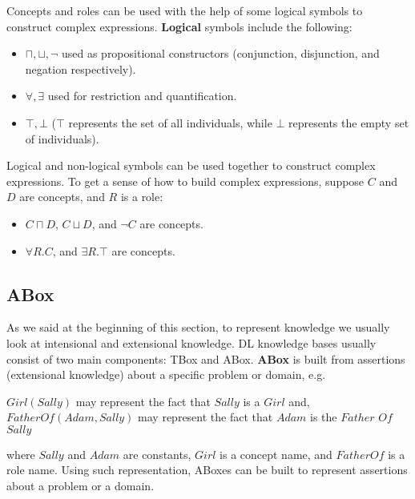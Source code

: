 \documentclass{sfuthesis}
\theoremstyle{plain}
\theoremstyle{definition}
\begin{document}
Concepts and roles can be used with the help of some logical symbols to construct complex expressions. \textbf{Logical} symbols include the following:
\begin{itemize}
\item $\sqcap, \sqcup, \neg$ used as propositional constructors (conjunction, disjunction, and negation respectively).
\item $\forall, \exists$ used for restriction and quantification.
\item $\top, \bot$ ($\top$ represents the set of all individuals, while $\bot$ represents the empty set of individuals). 
\end{itemize}

Logical and non-logical symbols can be used together to construct complex expressions. To get a sense of how to build complex expressions, suppose $C$ and $D$ are concepts, and $R$ is a role:
\begin{itemize}
\item $C \sqcap D$, $C \sqcup D$, and $\neg C$ are concepts.
\item $\forall R.C$, and $\exists R.\top$ are concepts.
\end{itemize}


\subsection{ABox}
As we said at the beginning of this section, to represent knowledge we usually look at intensional and extensional knowledge. DL knowledge bases usually consist of two main components: TBox and ABox. \textbf{ABox} is built from assertions (extensional knowledge) about a specific problem or domain, e.g.
\begin{center}
$Girl(Sally)$ may represent the fact that $Sally$ is a $Girl$ and, \\
$FatherOf(Adam, Sally)$ may represent the fact that $Adam$ is the $Father$ $Of$ $Sally$
\end{center} 
where $Sally$ and $Adam$ are constants, $Girl$ is a concept name, and $FatherOf$ is a role name. Using such representation, ABoxes can be built to represent assertions about a problem or a domain.
\end{document}
